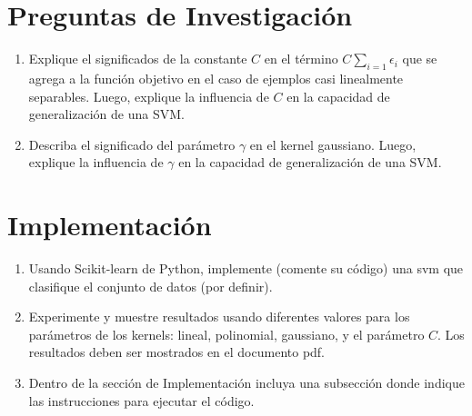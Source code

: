 \documentclass[paper=a4, fontsize=11pt]{scrartcl}
\numberwithin{equation}{section}		%
\numberwithin{figure}{section}			%
\numberwithin{table}{section}				%
\begin{document}
\section{Preguntas de Investigación}

\begin{enumerate}
    \item Explique el significados de la constante $C$ en el término $C\sum_{i=1}\epsilon_i$ que se agrega a la función objetivo en el caso de ejemplos casi linealmente separables. Luego, explique la influencia de $C$ en la capacidad de generalización de una SVM.
    
    \item Describa el significado del parámetro $\gamma$ en el kernel gaussiano. Luego, explique la influencia de $\gamma$ en la capacidad de generalización de una SVM.
    
\end{enumerate}

\section{Implementación}

\begin{enumerate}
    \item Usando Scikit-learn de Python, implemente (comente su código) una svm que clasifique el conjunto de datos (por definir).
    
    \item Experimente y muestre resultados usando diferentes valores para los parámetros de los kernels: lineal, polinomial, gaussiano, y el parámetro $C$. Los resultados deben ser mostrados en el documento pdf.
    
    \item Dentro de la sección de Implementación incluya una subsección donde indique las instrucciones para ejecutar el código.
\end{enumerate}

\end{document}
